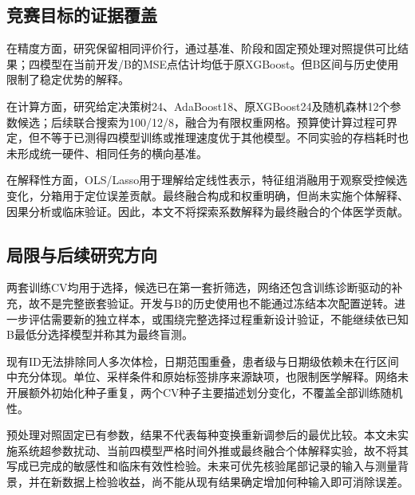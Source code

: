 \subsection{竞赛目标的证据覆盖}
在精度方面，研究保留相同评价行，通过基准、阶段和固定预处理对照提供可比结果；四模型在当前开发/B的MSE点估计均低于原XGBoost。但B区间与历史使用限制了稳定优势的解释。

在计算方面，研究给定决策树24、AdaBoost18、原XGBoost24及随机森林12个参数候选；后续联合搜索为100/12/8，融合为有限权重网格。预算使计算过程可界定，但不等于已测得四模型训练或推理速度优于其他模型。不同实验的存档耗时也未形成统一硬件、相同任务的横向基准。

在解释性方面，OLS/Lasso用于理解给定线性表示，特征组消融用于观察受控候选变化，分箱用于定位误差贡献。最终融合构成和权重明确，但尚未实施个体解释、因果分析或临床验证。因此，本文不将探索系数解释为最终融合的个体医学贡献。

\subsection{局限与后续研究方向}
两套训练CV均用于选择，候选已在第一套折筛选，网络还包含训练诊断驱动的补充，故不是完整嵌套验证。开发与B的历史使用也不能通过冻结本次配置逆转。进一步评估需要新的独立样本，或围绕完整选择过程重新设计验证，不能继续依已知B最低分选择模型并称其为最终盲测。

现有ID无法排除同人多次体检，日期范围重叠，患者级与日期级依赖未在行区间中充分体现。单位、采样条件和原始标签排序来源缺项，也限制医学解释。网络未开展额外初始化种子重复，两个CV种子主要描述划分变化，不覆盖全部训练随机性。

预处理对照固定已有参数，结果不代表每种变换重新调参后的最优比较。本文未实施系统超参数扰动、当前四模型严格时间外推或最终融合个体解释实验，故不将其写成已完成的敏感性和临床有效性检验。未来可优先核验尾部记录的输入与测量背景，并在新数据上检验收益，尚不能从现有结果确定增加何种输入即可消除误差。
